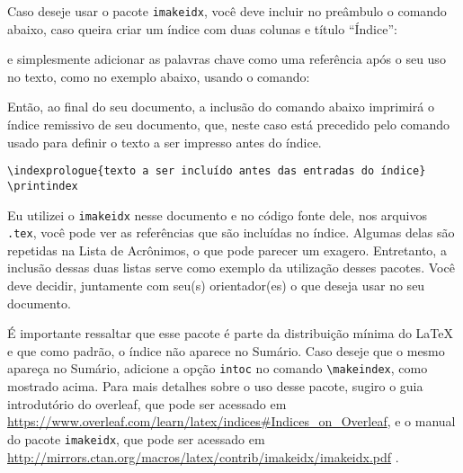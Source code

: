 Caso deseje usar o pacote \texttt{imakeidx}, você deve incluir no preâmbulo o comando abaixo, caso queira criar um índice com duas colunas e título ``Índice'':

e simplesmente adicionar as palavras chave como uma referência após o seu uso no texto, como no exemplo abaixo, usando o comando:


Então, ao final do seu documento, a inclusão do comando abaixo imprimirá o índice remissivo de seu documento, que, neste caso está precedido pelo comando usado para definir o texto a ser impresso antes do índice.

\begin{adjustbox}{fbox, center, tabular=l, vspace=0.5cm}
	\texttt{\textbackslash{}indexprologue\{texto a ser incluído antes das entradas do índice\}} \\
	\texttt{\textbackslash{}printindex}
\end{adjustbox}

Eu utilizei o \texttt{imakeidx} nesse documento e no código fonte dele, nos arquivos \texttt{.tex}, você pode ver as referências que são incluídas no índice. Algumas delas são repetidas na Lista de Acrônimos, o que pode parecer um exagero. Entretanto, a inclusão dessas duas listas serve como exemplo da utilização desses pacotes. Você deve decidir, juntamente com seu(s) orientador(es) o que deseja usar no seu documento.

É importante ressaltar que esse pacote é parte da distribuição mínima do \LaTeX{} e que como padrão, o índice não aparece no Sumário. Caso deseje que o mesmo apareça no Sumário, adicione a opção \texttt{intoc} no comando \texttt{\textbackslash{}makeindex}, como mostrado acima. Para mais detalhes sobre o uso desse pacote, sugiro o guia introdutório do \gls{overleaf}, que pode ser acessado em \url{https://www.overleaf.com/learn/latex/indices#Indices_on_Overleaf}, e o manual do pacote \texttt{imakeidx}, que pode ser acessado em \url{http://mirrors.ctan.org/macros/latex/contrib/imakeidx/imakeidx.pdf} \parencite{imakeidx}. 